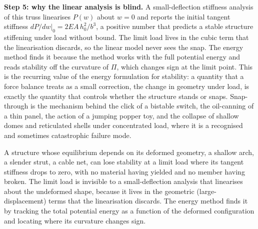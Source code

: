 \textbf{Step 5: why the linear analysis is blind.} A small-deflection
stiffness analysis of this truss linearises $P(w)$ about $w = 0$ and reports
the initial tangent stiffness $dP/dw|_0 = 2EA\,h_0^2/b^3$, a positive number
that predicts a stable structure stiffening under load without bound. The
limit load lives in the cubic term that the linearisation discards, so the
linear model never sees the snap. The energy method finds it because the
method works with the full potential energy and reads stability off the
curvature of $\Pi$, which changes sign at the limit point. This is the
recurring value of the energy formulation for stability: a quantity that a
force balance treats as a small correction, the change in geometry under
load, is exactly the quantity that controls whether the structure stands or
snaps. Snap-through is the mechanism behind the click of a bistable switch,
the oil-canning of a thin panel, the action of a jumping popper toy, and the
collapse of shallow domes and reticulated shells under concentrated load,
where it is a recognised and sometimes catastrophic failure mode.

\begin{principle}
A structure whose equilibrium depends on its deformed geometry, a shallow
arch, a slender strut, a cable net, can lose stability at a limit load where
its tangent stiffness drops to zero, with no material having yielded and no
member having broken. The limit load is invisible to a small-deflection
analysis that linearises about the undeformed shape, because it lives in the
geometric (large-displacement) terms that the linearisation discards. The
energy method finds it by tracking the total potential energy as a function
of the deformed configuration and locating where its curvature changes sign.
\end{principle}

